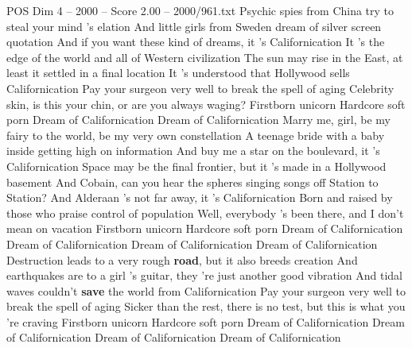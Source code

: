 \begin{textsample}{POS Dim 4 – 2000 – Score 2.00 – 2000/961.txt}  \label{ex:f4_pos_018}
Psychic spies from China try to steal your mind 's elation And little girls from Sweden dream of silver screen quotation And if you want these kind of dreams, it 's Californication It 's the edge of the world and all of Western civilization The sun may rise in the East, at least it settled in a final location It 's understood that Hollywood sells Californication Pay your surgeon very well to break the spell of aging Celebrity skin, is this your chin, or are you always waging?
Firstborn unicorn Hardcore soft porn Dream of Californication Dream of Californication Marry me, girl, be my fairy to the world, be my very own constellation A teenage bride with a baby inside getting high on information And buy me a star on the boulevard, it 's Californication Space may be the final frontier, but it 's made in a Hollywood basement And Cobain, can you hear the spheres singing songs off Station to Station?
And Alderaan 's not far away, it 's Californication Born and raised by those who praise control of population Well, everybody 's been there, and I don't mean on vacation Firstborn unicorn Hardcore soft porn Dream of Californication Dream of Californication Dream of Californication Dream of Californication Destruction leads to a very rough \textbf{road}, but it also breeds creation And earthquakes are to a girl 's guitar, they 're just another good vibration And tidal waves couldn't \textbf{save} the world from Californication Pay your surgeon very well to break the spell of aging Sicker than the rest, there is no test, but this is what you 're craving Firstborn unicorn Hardcore soft porn Dream of Californication Dream of Californication Dream of Californication Dream of Californication

\end{textsample}
